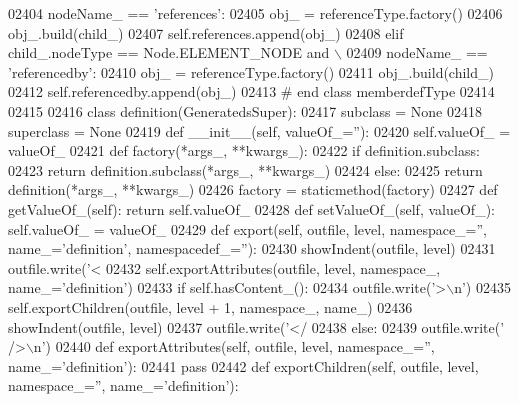 \begin{DoxyCode}
{{{{{{{{{{{{{{{{{{{{{{{{{{{{{{{{{{{{{{{{{{{{{{{{{{{{{{{{{{{{{{{{{{{{{{{{{{{{{{{{{{{{{{{{{{{{{{{{{{{{{{{{{{{{{{{{{{{{{{{{{{{{{{{{{{{{{{{{{{{{{{{{{{{{{{{{{{{{{{{{{{{{{{{{{{02404             nodeName\_ == \textcolor{stringliteral}{'references'}:
02405             obj\_ = referenceType.factory()
02406             obj\_.build(child\_)
02407             self.references.append(obj\_)
02408         \textcolor{keywordflow}{elif} child\_.nodeType == Node.ELEMENT\_NODE \textcolor{keywordflow}{and} \(\backslash\)
02409             nodeName\_ == \textcolor{stringliteral}{'referencedby'}:
02410             obj\_ = referenceType.factory()
02411             obj\_.build(child\_)
02412             self.referencedby.append(obj\_)
02413 \textcolor{comment}{# end class memberdefType}
02414 
02415 
02416 \textcolor{keyword}{class }definition(GeneratedsSuper):
02417     subclass = \textcolor{keywordtype}{None}
02418     superclass = \textcolor{keywordtype}{None}
02419     \textcolor{keyword}{def }__init__(self, valueOf\_=''):
02420         self.valueOf_ = valueOf\_
02421     \textcolor{keyword}{def }factory(*args\_, **kwargs\_):
02422         \textcolor{keywordflow}{if} definition.subclass:
02423             \textcolor{keywordflow}{return} definition.subclass(*args\_, **kwargs\_)
02424         \textcolor{keywordflow}{else}:
02425             \textcolor{keywordflow}{return} definition(*args\_, **kwargs\_)
02426     factory = staticmethod(factory)
02427     \textcolor{keyword}{def }getValueOf_(self): \textcolor{keywordflow}{return} self.valueOf\_
02428     \textcolor{keyword}{def }setValueOf_(self, valueOf\_): self.valueOf\_ = valueOf\_
02429     \textcolor{keyword}{def }export(self, outfile, level, namespace\_='', name\_='definition', namespacedef\_=''):
02430         showIndent(outfile, level)
02431         outfile.write(\textcolor{stringliteral}{'<%
02432         self.exportAttributes(outfile, level, namespace\_, name\_=\textcolor{stringliteral}{'definition'})
02433         \textcolor{keywordflow}{if} self.hasContent_():
02434             outfile.write(\textcolor{stringliteral}{'>\(\backslash\)n'})
02435             self.exportChildren(outfile, level + 1, namespace\_, name\_)
02436             showIndent(outfile, level)
02437             outfile.write(\textcolor{stringliteral}{'</%
02438         \textcolor{keywordflow}{else}:
02439             outfile.write(\textcolor{stringliteral}{' />\(\backslash\)n'})
02440     \textcolor{keyword}{def }exportAttributes(self, outfile, level, namespace\_='', name\_='definition'):
02441         \textcolor{keywordflow}{pass}
02442     \textcolor{keyword}{def }exportChildren(self, outfile, level, namespace\_='', name\_='definition'):
}}}}}}}}}}}}}}}}}}}}}}}}}}}}}}}}}}}}}}}}}}}}}}}}}}}}}}}}}}}}}}}}}}}}}}}}}}}}}}}}}}}}}}}}}}}}}}}}}}}}}}}}}}}}}}}}}}}}}}}}}}}}}}}}}}}}}}}}}}}}}}}}}}}}}}}}}}}}}}}}}}}}}}}}}}}}
\end{DoxyCode}
